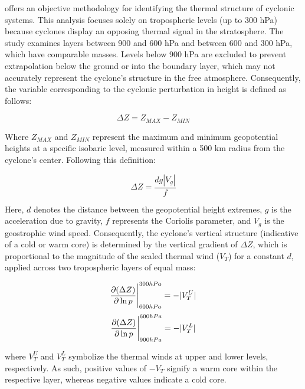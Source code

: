 \citet{hart2003cyclone} offers an objective methodology for identifying the thermal structure of cyclonic systems. This analysis focuses solely on tropospheric levels (up to 300 hPa) because cyclones display an opposing thermal signal in the stratosphere. The study examines layers between 900 and 600 hPa and between 600 and 300 hPa, which have comparable masses. Levels below 900 hPa are excluded to prevent extrapolation below the ground or into the boundary layer, which may not accurately represent the cyclone's structure in the free atmosphere. Consequently, the variable corresponding to the cyclonic perturbation in height is defined as follows:

\begin{equation}\label{height_pertubation}
    \Delta Z = Z_{MAX} - Z_{MIN}
\end{equation}

Where \(Z_{MAX}\) and \(Z_{MIN}\) represent the maximum and minimum geopotential heights at a specific isobaric level, measured within a 500 km radius from the cyclone's center. Following this definition:

\begin{equation}
    \Delta Z = \frac{dg |V_g|}{f}
\end{equation}

Here, \(d\) denotes the distance between the geopotential height extremes, \(g\) is the acceleration due to gravity, \(f\) represents the Coriolis parameter, and \(V_g\) is the geostrophic wind speed. Consequently, the cyclone's vertical structure (indicative of a cold or warm core) is determined by the vertical gradient of \(\Delta Z\), which is proportional to the magnitude of the scaled thermal wind (\(V_T\)) for a constant \(d\), applied across two tropospheric layers of equal mass:


\begin{equation}
    \frac{\partial (\Delta Z)}{\partial \ln p} \Bigg|_{600 hPa}^{300 hPa} = -|V^{U}_{T}| \\
\end{equation}
\begin{equation}\label{eq_VTL}
    \frac{\partial (\Delta Z)}{\partial \ln p} \Bigg|_{900 hPa}^{600 hPa} = -|V^{L}_{T}| \\
\end{equation}

where \(V^{U}_{T}\) and \(V^{L}_{T}\) symbolize the thermal winds at upper and lower levels, respectively. As such, positive values of \(-V_T\) signify a warm core within the respective layer, whereas negative values indicate a cold core.

